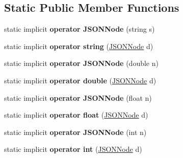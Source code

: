 \subsection*{Static Public Member Functions}
\begin{DoxyCompactItemize}
\item 
static implicit {\bfseries operator J\+S\+O\+N\+Node} (string s)\hypertarget{classSimpleJSON_1_1JSONNode_aeaf495a0bd9632ceca7375934d24b541}{}\label{classSimpleJSON_1_1JSONNode_aeaf495a0bd9632ceca7375934d24b541}

\item 
static implicit {\bfseries operator string} (\hyperlink{classSimpleJSON_1_1JSONNode}{J\+S\+O\+N\+Node} d)\hypertarget{classSimpleJSON_1_1JSONNode_a498348138d87b84eaacb795cc9727ac2}{}\label{classSimpleJSON_1_1JSONNode_a498348138d87b84eaacb795cc9727ac2}

\item 
static implicit {\bfseries operator J\+S\+O\+N\+Node} (double n)\hypertarget{classSimpleJSON_1_1JSONNode_a2481f6b35d7f8f0917aa8c9f383aef0b}{}\label{classSimpleJSON_1_1JSONNode_a2481f6b35d7f8f0917aa8c9f383aef0b}

\item 
static implicit {\bfseries operator double} (\hyperlink{classSimpleJSON_1_1JSONNode}{J\+S\+O\+N\+Node} d)\hypertarget{classSimpleJSON_1_1JSONNode_acaf63acc9313f877308fbb80ce50fa1c}{}\label{classSimpleJSON_1_1JSONNode_acaf63acc9313f877308fbb80ce50fa1c}

\item 
static implicit {\bfseries operator J\+S\+O\+N\+Node} (float n)\hypertarget{classSimpleJSON_1_1JSONNode_a15b45a287745b0070bdf40d8d66ecee8}{}\label{classSimpleJSON_1_1JSONNode_a15b45a287745b0070bdf40d8d66ecee8}

\item 
static implicit {\bfseries operator float} (\hyperlink{classSimpleJSON_1_1JSONNode}{J\+S\+O\+N\+Node} d)\hypertarget{classSimpleJSON_1_1JSONNode_ad96f121c11522f6869cb49e5453c9c87}{}\label{classSimpleJSON_1_1JSONNode_ad96f121c11522f6869cb49e5453c9c87}

\item 
static implicit {\bfseries operator J\+S\+O\+N\+Node} (int n)\hypertarget{classSimpleJSON_1_1JSONNode_a558af594a87bbea3f57bba65b14ff131}{}\label{classSimpleJSON_1_1JSONNode_a558af594a87bbea3f57bba65b14ff131}

\item 
static implicit {\bfseries operator int} (\hyperlink{classSimpleJSON_1_1JSONNode}{J\+S\+O\+N\+Node} d)\hypertarget{classSimpleJSON_1_1JSONNode_a1aa8c58e9230ad56005bdb9176b109f8}{}\label{classSimpleJSON_1_1JSONNode_a1aa8c58e9230ad56005bdb9176b109f8}


\end{DoxyCompactItemize}
